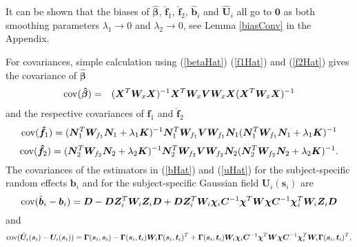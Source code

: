 \documentclass[article,lineno]{biometrika}
\begin{document}
It can be shown that the biases of $\boldsymbol {\hat \beta}$, $\boldsymbol {\hat f}_1$, $\boldsymbol {\hat f}_2$, $\boldsymbol {\hat b}_i$ and $\boldsymbol {\hat U}_i$ all go to $\boldsymbol 0$ as both smoothing parameters $\lambda_1 \to 0$ and $\lambda_2 \to 0$, see Lemma \ref{biasConv} in the Appendix.



  
For covariances, simple calculation using (\ref{betaHat}) (\ref{f1Hat}) and (\ref{f2Hat}) gives the covariance of $\boldsymbol {\hat \beta}$  
\begin{eqnarray*}
{\rm cov}(\boldsymbol {\hat \beta}) 
&=&
(\boldsymbol X^T  \boldsymbol W_x \boldsymbol X )^{-1} \boldsymbol X^T  \boldsymbol W_x 
\boldsymbol V 
\boldsymbol W_x \boldsymbol X (\boldsymbol X^T  \boldsymbol W_x \boldsymbol X )^{-1} 
\end{eqnarray*}
and the respective covariances of $\boldsymbol {\hat f}_1$  and $\boldsymbol {\hat f}_2$
$$
{\rm cov}(\boldsymbol {\hat f}_1) 
=
(\boldsymbol N_1^T 
\boldsymbol W_{f_1}  \boldsymbol N_1
  + \lambda_1 \boldsymbol K)^{-1}  \boldsymbol N_1^T \boldsymbol W_{f_1}
   \boldsymbol V 
\boldsymbol W_{f_1} \boldsymbol N_1
(\boldsymbol N_1^T 
\boldsymbol W_{f_1}  \boldsymbol N_1
  + \lambda_1 \boldsymbol K)^{-1}
$$
$$
{\rm cov}(\boldsymbol {\hat f}_2) 
=
(\boldsymbol N_2^T \boldsymbol W_{f_2}  \boldsymbol N_2 + \lambda_2 \boldsymbol K)^{-1} 
\boldsymbol N_2^T \boldsymbol W_{f_2} 
   \boldsymbol V 
\boldsymbol W_{f_2} \boldsymbol N_2
(\boldsymbol N_2^T \boldsymbol W_{f_2}  \boldsymbol N_2 + \lambda_2 \boldsymbol K)^{-1}.
$$
The covariances of the estimators in (\ref{bHat}) and (\ref{uHat}) for the subject-specific random effects $\boldsymbol b_i$ and for the subject-specific Gaussian field $\boldsymbol U_i(\boldsymbol s_i)$
 are  
 \begin{equation}
 \label{covIn}
{\rm cov}(\hat{\boldsymbol b}_i - \boldsymbol b_i) 
= \boldsymbol D 
-
\boldsymbol D \boldsymbol Z_i^T \boldsymbol W_i  \boldsymbol Z_i  \boldsymbol D 
+
\boldsymbol D \boldsymbol Z_i^T \boldsymbol W_i
\boldsymbol \chi_i  \boldsymbol C^{-1} \boldsymbol \chi^T
\boldsymbol W
\boldsymbol \chi  \boldsymbol C^{-1} \boldsymbol \chi_i^T
\boldsymbol  W_i \boldsymbol Z_i \boldsymbol D
\end{equation}
and 
$$
{\rm cov}(\hat{\boldsymbol U}_i (\boldsymbol s_i) - \boldsymbol U_i (\boldsymbol s_i) ) 
= \boldsymbol \Gamma(\boldsymbol s_i, \boldsymbol s_i) 
-
\boldsymbol \Gamma(\boldsymbol s_i, \boldsymbol t_i) 
\boldsymbol W_i  
\boldsymbol \Gamma(\boldsymbol s_i, \boldsymbol t_i)^T 
+
\boldsymbol \Gamma(\boldsymbol s_i, \boldsymbol t_i) \boldsymbol W_i
\boldsymbol \chi_i  \boldsymbol C^{-1} \boldsymbol \chi^T
\boldsymbol W
\boldsymbol \chi  \boldsymbol C^{-1} \boldsymbol \chi_i^T
\boldsymbol  W_i \boldsymbol \Gamma(\boldsymbol s_i, \boldsymbol t_i)^T,
$$
\end{document}

